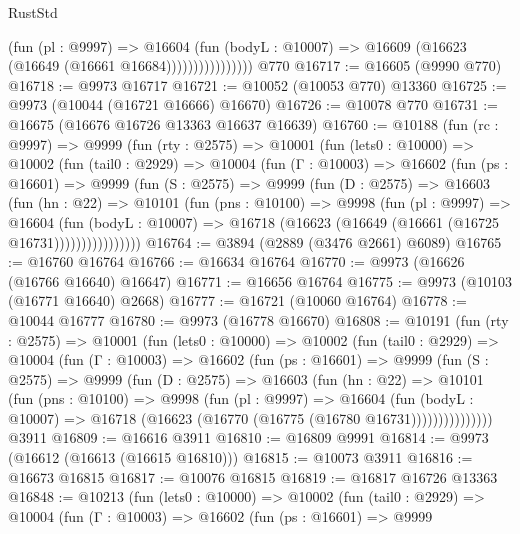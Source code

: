 \begin{lexlean}{RustStd}
\begin{coremodule}
                          (fun (pl : @9997) =>
                          @16604
                            (fun (bodyL : @10007) =>
                            @16609 (@16623 (@16649 (@16661 @16684))))))))))))))))
    @770
@16717 := @16605 (@9990 @770)
@16718 := @9973 @16717
@16721 := @10052 (@10053 @770) @13360
@16725 := @9973 (@10044 (@16721 @16666) @16670)
@16726 := @10078 @770
@16731 := @16675 (@16676 @16726 @13363 @16637 @16639)
@16760 := @10188
    (fun (rc : @9997) =>
    @9999
      (fun (rty : @2575) =>
      @10001
        (fun (lets0 : @10000) =>
        @10002
          (fun (tail0 : @2929) =>
          @10004
            (fun (Γ : @10003) =>
            @16602
              (fun (ps : @16601) =>
              @9999
                (fun (S : @2575) =>
                @9999
                  (fun (D : @2575) =>
                  @16603
                    (fun (hn : @22) =>
                    @10101
                      (fun (pns : @10100) =>
                      @9998
                        (fun (pl : @9997) =>
                        @16604
                          (fun (bodyL : @10007) =>
                          @16718 (@16623 (@16649 (@16661 (@16725 @16731))))))))))))))))
@16764 := @3894 (@2889 (@3476 @2661) @6089)
@16765 := @16760 @16764
@16766 := @16634 @16764
@16770 := @9973 (@16626 (@16766 @16640) @16647)
@16771 := @16656 @16764
@16775 := @9973 (@10103 (@16771 @16640) @2668)
@16777 := @16721 (@10060 @16764)
@16778 := @10044 @16777
@16780 := @9973 (@16778 @16670)
@16808 := @10191
    (fun (rty : @2575) =>
    @10001
      (fun (lets0 : @10000) =>
      @10002
        (fun (tail0 : @2929) =>
        @10004
          (fun (Γ : @10003) =>
          @16602
            (fun (ps : @16601) =>
            @9999
              (fun (S : @2575) =>
              @9999
                (fun (D : @2575) =>
                @16603
                  (fun (hn : @22) =>
                  @10101
                    (fun (pns : @10100) =>
                    @9998
                      (fun (pl : @9997) =>
                      @16604
                        (fun (bodyL : @10007) =>
                        @16718 (@16623 (@16770 (@16775 (@16780 @16731)))))))))))))))
    @3911
@16809 := @16616 @3911
@16810 := @16809 @9991
@16814 := @9973 (@16612 (@16613 (@16615 @16810)))
@16815 := @10073 @3911
@16816 := @16673 @16815
@16817 := @10076 @16815
@16819 := @16817 @16726 @13363
@16848 := @10213
    (fun (lets0 : @10000) =>
    @10002
      (fun (tail0 : @2929) =>
      @10004
        (fun (Γ : @10003) =>
        @16602
          (fun (ps : @16601) =>
          @9999

\end{coremodule}
\end{lexlean}
